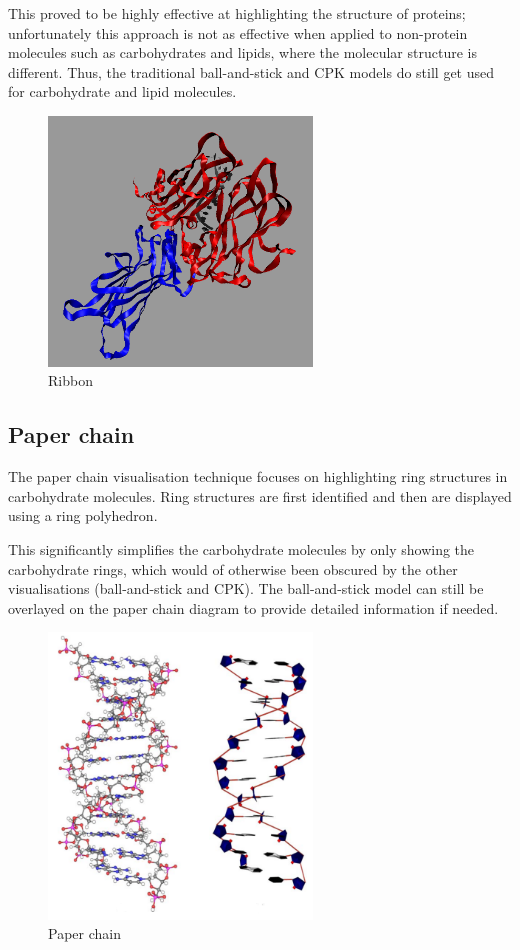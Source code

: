 \documentclass[a4paper]{article}
\begin{document}
This proved to be highly effective at highlighting the structure of proteins;
unfortunately this approach is not as effective when applied to non-protein
molecules such as carbohydrates and lipids, where the molecular structure is
different. Thus, the traditional ball-and-stick and CPK models do still get
used for carbohydrate and lipid molecules.

\begin{figure}[h!]
  \begin{center}
    \includegraphics[width=70mm]{ribbon}
  \end{center}
  \caption{Ribbon}
  \label{fig:ribbon}
\end{figure}

\subsection*{Paper chain}
The paper chain visualisation technique \citep{kuttel06} focuses on highlighting
ring structures in carbohydrate molecules. Ring structures are first identified
and then are displayed using a ring polyhedron.

This significantly simplifies the carbohydrate molecules by only showing the
carbohydrate rings, which would of otherwise been obscured by the other
visualisations (ball-and-stick and CPK). The ball-and-stick model can still be
overlayed on the paper chain diagram to provide detailed information if needed.

\begin{figure}[h!]
  \begin{center}
    \includegraphics[width=70mm]{paper_chain}
  \end{center}
  \caption{Paper chain}
  \label{fig:paperchain}
\end{figure}
\end{document}
